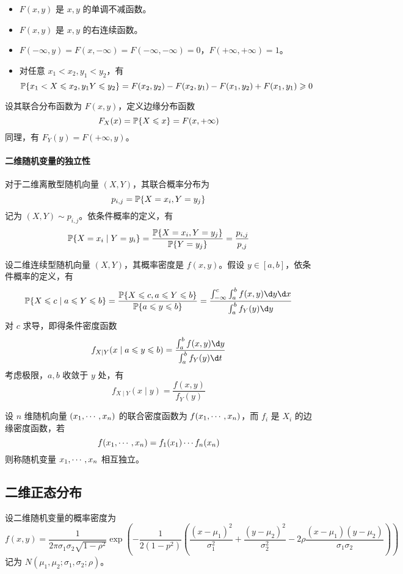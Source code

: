 \begin{itemize}
	\item $F(x, y)$ 是 $x, y$ 的单调不减函数。
	\item $F(x, y)$ 是 $x, y$ 的右连续函数。
	\item $F(-\infty, y) = F(x, -\infty) = F(-\infty, -\infty) = 0$，$F(+\infty, +\infty) = 1$。
	\item 对任意 $x_1 < x_2, y_1 < y_2$，有
	      \[ \mathbb{P}\{x_1 < X \leqslant x_2, y_1 Y \leqslant y_2\} = F(x_2, y_2) - F(x_2, y_1) - F(x_1, y_2) + F(x_1, y_1) \geqslant 0 \]
\end{itemize}

设其联合分布函数为 $F(x,y)$，定义边缘分布函数
\[ F_X(x) = \mathbb{P}\{X \leqslant x\} = F(x, +\infty) \]
同理，有 $F_Y(y) = F(+\infty, y)$。



\paragraph{二维随机变量的独立性}

对于二维离散型随机向量 $(X, Y)$，其联合概率分布为
\[ p_{i,j} = \mathbb{P}\{X= x_i, Y = y_j\} \]
记为 $(X,Y) \sim p_{i,j}$。依条件概率的定义，有
\[ \mathbb{P}\{ X = x_i \mid Y = y_i \} = \frac{\mathbb{P}\{X = x_i, Y = y_j\}}{\mathbb{P}\{Y=y_j\}} = \frac{p_{i, j}}{p_{, j}} \]

设二维连续型随机向量 $(X, Y)$，其概率密度是 $f(x, y)$。假设 $y \in [a, b]$，依条件概率的定义，有
\[ \bbP\{X \leqslant c \mid a \leqslant Y \leqslant b\} = \frac{\bbP\{X \leqslant c , a \leqslant Y \leqslant b\}}{\bbP\{a \leqslant y \leqslant b \}} = \frac{\int_{-\infty}^c \int_{a}^b f(x, y) \d y \d x }{\int_a^b f_Y(y) \d y }\]
对 $c$ 求导，即得条件密度函数
\[ f_{X \mid Y}(x \mid a \leqslant y \leqslant b) = \frac{\int_{a}^b f(x, y) \d y}{\int_{a}^b f_{Y}(y) \d t} \]
考虑极限，$a, b$ 收敛于 $y$ 处，有
\[ f_{X \mid Y}(x \mid y) = \frac{f(x, y)}{f_{Y}(y)} \]

设 $n$ 维随机向量 $(x_1,\cdots,x_n)$ 的联合密度函数为 $f(x_1,\cdots,x_n)$，而 $f_i$ 是 $X_i$ 的边缘密度函数，若
\[ f(x_1,\cdots,x_n) = f_1(x_1) \cdots f_n(x_n) \]
则称随机变量 $x_1,\cdots,x_n$ 相互独立。

\subsection{二维正态分布}

设二维随机变量的概率密度为
\[ f(x, y) = \frac{1}{2 \pi \sigma_1 \sigma_2 \sqrt{1 - \rho^2}} \exp \left( -\frac{1}{2(1-p^2)} \left(\frac{(x-\mu_1)^2}{\sigma_1^2} + \frac{(y-\mu_2)^2}{\sigma_2^2} - 2 \rho\frac{(x-\mu_1)(y-\mu_2)}{\sigma_1 \sigma_2}\right) \right) \]
记为 $N(\mu_1, \mu_2; \sigma_1, \sigma_2; \rho)$。


